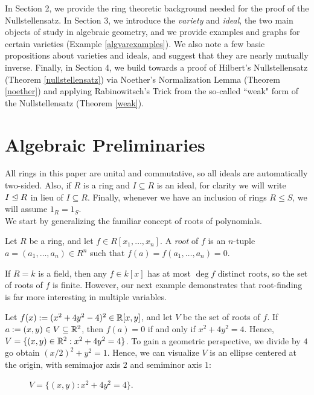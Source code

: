 \documentclass{article}
\begin{document}
In Section 2, we provide the ring theoretic background needed for the proof of the Nullstellensatz. In Section 3, we introduce the \textit{variety} and \textit{ideal}, the two main objects of study in algebraic geometry, and we provide examples and graphs for certain varieties (Example \ref{algvarexamples}). We also note a few basic propositions about varieties and ideals, and suggest that they are nearly mutually inverse. Finally, in Section 4, we build towards a proof of Hilbert's Nullstellensatz (Theorem \ref{nullstellensatz}) via Noether's Normalization Lemma (Theorem \ref{noether}) and applying Rabinowitsch's Trick from the so-called ``weak" form of the Nullstellensatz (Theorem \ref{weak}).

\section{Algebraic Preliminaries}
All rings in this paper are unital and commutative, so all ideals are automatically two-sided. Also, if $R$ is a ring and $I\subseteq R$ is an ideal, for clarity we will write $I\trianglelefteq R$ in lieu of $I\subseteq R$. Finally, whenever we have an inclusion of rings $R\leq S$, we will assume $1_R = 1_S$.
\\

We start by generalizing the familiar concept of roots of polynomials.
\begin{definition}\label{root}
Let $R$ be a ring, and let $f\in R[x_1, \ldots, x_n]$. A \textit{root} of $f$ is an $n$-tuple $a = (a_1, \ldots, a_n)\in R^n$ such that $f(a) = f(a_1, \ldots, a_n) = 0$.
\end{definition}

If $R = k$ is a field, then any $f \in k[x]$ has at most $\deg f$ distinct roots, so the set of roots of $f$ is finite. However, our next example demonstrates that root-finding is far more interesting in multiple variables.

\begin{example}\label{x^2+4y^2-4}
Let $f(x):= (x^2+4y^2-4)^2\in \mathbb R[x,y]$, and let $V$ be the set of roots of $f$. If $a := (x,y)\in V\subseteq \mathbb R^2$, then $f(a) = 0$ if and only if $x^2+4y^2=4$. Hence, $V = \{(x,y)\in \mathbb R^2: x^2+4y^2=4\}$. To gain a geometric perspective, we divide by $4$ go obtain $(x/2)^2+ y^2 = 1$. Hence, we can visualize $V$ is an ellipse centered at the origin, with semimajor axis $2$ and semiminor axis $1$: 
\begin{figure}[h!]
    \centering
    \caption{$V = \{(x,y): x^2+4y^2=4\}$.}
    \label{ellipse}
\end{figure}
\end{example}
\end{document}
